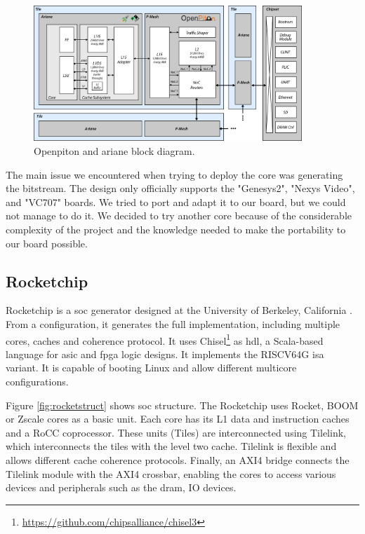 \begin{figure}[h]
    \centering
    \includegraphics[width=0.9\textwidth]{images/openpiton_ariane_blockdiag.png}
    \caption{Openpiton and ariane block diagram.}
    \label{fig:openpitonariane}
\end{figure}

The main issue we encountered when trying to deploy the core was generating the bitstream. The design only officially supports the "Genesys2", "Nexys Video", and "VC707" boards. We tried to port and adapt it to our board, but we could not manage to do it. We decided to try another core because of the considerable complexity of the project and the knowledge needed to make the portability to our board possible.

\subsection{Rocketchip}
Rocketchip is a \gls{soc} generator designed at the University of Berkeley, California \cite{rocket}. From a configuration, it generates the full implementation, including multiple cores, caches and coherence protocol. It uses Chisel\footnote{\url{https://github.com/chipsalliance/chisel3}} as \gls{hdl}, a Scala-based language for \gls{asic} and \gls{fpga} logic designs. It implements the RISCV64G \gls{isa} variant. It is capable of booting Linux and allow different multicore configurations.

Figure \ref{fig:rocketstruct} shows \gls{soc} structure. The Rocketchip uses Rocket, BOOM or Zscale cores as a basic unit. Each core has its L1 data and instruction caches and a RoCC coprocessor. These units (Tiles) are interconnected using Tilelink, which interconnects the tiles with the level two cache. Tilelink is flexible and allows different cache coherence protocols. Finally, an AXI4 bridge connects the Tilelink module with the AXI4 crossbar, enabling the cores to access various devices and peripherals such as the \gls{dram}, IO devices.

